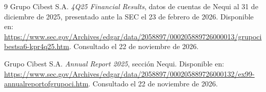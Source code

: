 \documentclass[12pt,a4paper]{article}
\begin{document}
\begin{thebibliography}{9}
Grupo Cibest S.A. \emph{4Q25 Financial Results}, datos de cuentas de Nequi al 31 de diciembre de 2025, presentado ante la SEC el 23 de febrero de 2026. Disponible en: \url{https://www.sec.gov/Archives/edgar/data/2058897/000205889726000013/grupocibestsa6-kpr4q25.htm}. Consultado el 22 de noviembre de 2026.

Grupo Cibest S.A. \emph{Annual Report 2025}, sección Nequi. Disponible en: \url{https://www.sec.gov/Archives/edgar/data/2058897/000205889726000132/ex99-annualreportofgrupoci.htm}. Consultado el 22 de noviembre de 2026.

\end{thebibliography}
\end{document}
